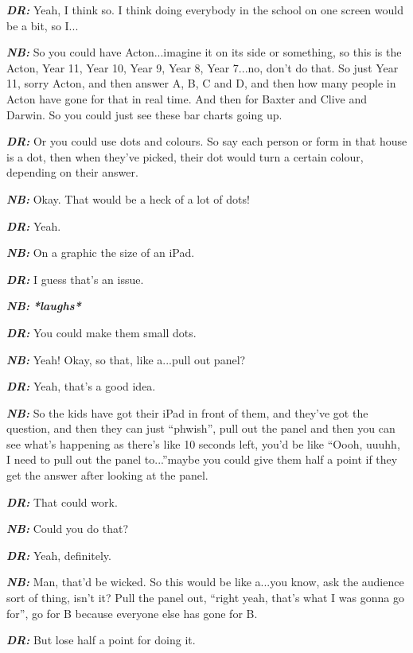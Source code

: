 \textit{\textbf{DR:}} Yeah, I think so. I think doing everybody in the school on one screen would be a bit, so I...

\textit{\textbf{NB:}} So you could have Acton...imagine it on its side or something, so this is the Acton, Year 11, Year 10, Year 9, Year 8, Year 7...no, don't do that. So just Year 11, sorry Acton, and then answer A, B, C and D, and then how many people in Acton have gone for that in real time. And then for Baxter and Clive and Darwin. So you could just see these bar charts going up.

\textit{\textbf{DR:}} Or you could use dots and colours. So say each person or form in that house is a dot, then when they've picked, their dot would turn a certain colour, depending on their answer.

\textit{\textbf{NB:}} Okay. That would be a heck of a lot of dots!

\textit{\textbf{DR:}} Yeah.

\textit{\textbf{NB:}} On a graphic the size of an iPad.

\textit{\textbf{DR:}} I guess that's an issue.

\textit{\textbf{NB:}} \textit{\textbf{*laughs*}}

\textit{\textbf{DR:}} You could make them small dots.

\textit{\textbf{NB:}} Yeah! Okay, so that, like a...pull out panel?

\textit{\textbf{DR:}} Yeah, that's a good idea.

\textit{\textbf{NB:}} So the kids have got their iPad in front of them, and they've got the question, and then they can just ``phwish'', pull out the panel and then you can see what's happening as there's like 10 seconds left, you'd be like ``Oooh, uuuhh, I need to pull out the panel to...''maybe you could give them half a point if they get the answer after looking at the panel.

\textit{\textbf{DR:}} That could work.

\textit{\textbf{NB:}} Could you do that?

\textit{\textbf{DR:}} Yeah, definitely.

\textit{\textbf{NB:}} Man, that'd be wicked. So this would be like a...you know, ask the audience sort of thing, isn't it? Pull the panel out, ``right yeah, that's what I was gonna go for'', go for B because everyone else has gone for B.

\textit{\textbf{DR:}} But lose half a point for doing it.

